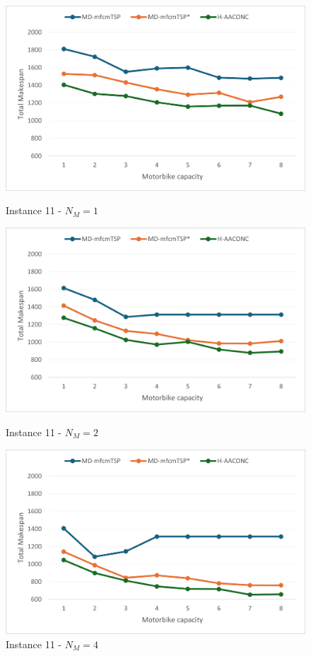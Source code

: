 \documentclass{article}
\begin{document}
	\begin{figure}[h]
		\centering
		\begin{minipage}{0.33\textwidth}
			\centering
			\includegraphics[scale=0.42]{p11_NM1}\;
			\caption{Instance 11 - $N_M=1$}
			\label{fig:p11_NM1}
		\end{minipage}
		\begin{minipage}{0.33\textwidth}
			\centering
			\includegraphics[scale=0.42]{p11_NM2}\;
			\caption{Instance 11 - $N_M=2$}
			\label{fig:p11_NM2}
		\end{minipage}
		\begin{minipage}{0.33\textwidth}
			\centering
			\includegraphics[scale=0.42]{p11_NM4}\;
			\caption{Instance 11 - $N_M=4$}
			\label{fig:p11_NM4}
		\end{minipage}
	\end{figure}
	
\end{document}
